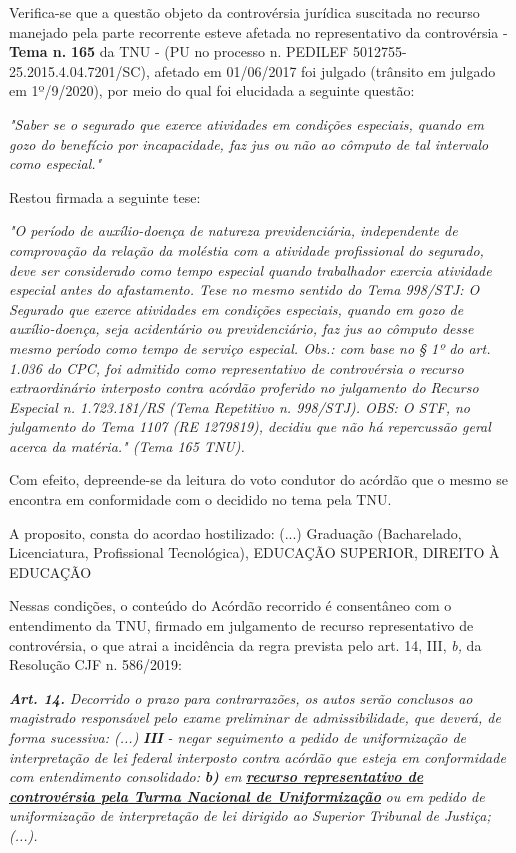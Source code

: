 \documentclass[12pt]{article}
\begin{document}
\justifying
\noindent Verifica-se que a questão objeto da controvérsia jurídica suscitada no recurso manejado pela parte recorrente esteve afetada no representativo da controvérsia - \textbf{Tema n. }\textbf{165} da TNU - (PU no processo n. PEDILEF 5012755-25.2015.4.04.7201/SC),  afetado em 01/06/2017 foi julgado (trânsito em julgado em 1º/9/2020), por meio do qual foi elucidada a seguinte questão:

\noindent \textit{"Saber se o segurado que exerce atividades em condições especiais, quando em gozo do benefício por incapacidade, faz jus ou não ao cômputo de tal intervalo como especial."}

\noindent Restou firmada a seguinte tese:

\noindent \textit{"O período de auxílio-doença de natureza previdenciária, independente de comprovação da relação da moléstia com a atividade profissional do segurado, deve ser considerado como tempo especial quando trabalhador exercia atividade especial antes do afastamento. Tese no mesmo sentido do Tema 998/STJ: O Segurado que exerce atividades em condições especiais, quando em gozo de auxílio-doença, seja acidentário ou previdenciário, faz jus ao cômputo desse mesmo período como tempo de serviço especial. Obs.: com base no § 1º do art. 1.036 do CPC, foi admitido como representativo de controvérsia o recurso extraordinário interposto contra acórdão proferido no julgamento do Recurso Especial n. 1.723.181/RS (Tema Repetitivo n. 998/STJ). OBS: O STF, no julgamento do Tema 1107 (RE 1279819), decidiu que não há repercussão geral acerca da matéria." (Tema 165 TNU).}

\noindent Com efeito, depreende-se da leitura do voto condutor do acórdão que o mesmo se encontra em conformidade com o decidido no  tema pela TNU.

\noindent A proposito, consta do acordao hostilizado: (...) Graduação (Bacharelado, Licenciatura, Profissional Tecnológica), EDUCAÇÃO SUPERIOR, DIREITO À EDUCAÇÃO

\noindent Nessas condições, o conteúdo do Acórdão recorrido é consentâneo com o entendimento da TNU, firmado em julgamento de recurso representativo de controvérsia, o que atrai a incidência da regra prevista pelo art. 14, III, \textit{b,} da Resolução CJF n. 586/2019:

\noindent \textit{\textbf{Art. 14.}}\textit{ Decorrido o prazo para contrarrazões, os autos serão conclusos ao magistrado responsável pelo exame preliminar de admissibilidade, que deverá, de forma sucessiva: (...) }\textit{\textbf{III }}\textit{- negar seguimento a pedido de uniformização de interpretação de lei federal interposto contra acórdão que esteja em conformidade com entendimento consolidado: }\textit{\textbf{b)}}\textit{ em }\uline{\textit{\textbf{recurso representativo de controvérsia pela Turma Nacional de Uniformização}}}\textit{ ou em pedido de uniformização de interpretação de lei dirigido ao Superior Tribunal de Justiça;(...).}
\end{document}
